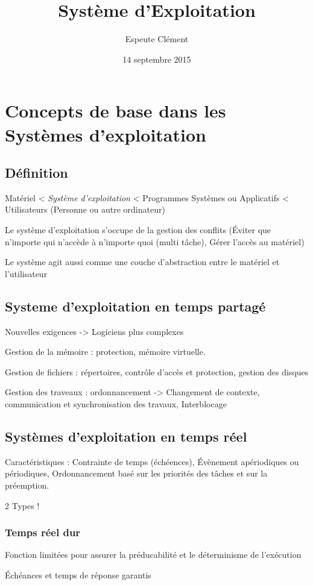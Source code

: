 \documentclass[11pt]{article}
\title{Système d'Exploitation}
\author{{\sc Espeute} Clément}
\date{14 septembre 2015}
\begin{document}
\pagestyle{fancy}
\maketitle
\newpage
\tableofcontents
\newpage
\section{Concepts de base dans les Systèmes d'exploitation}
\subsection{Définition}
\label{sub:}
Matériel < \emph{ Système d'exploitation} < Programmes Systèmes ou Applicatifs < Utilisateurs (Personne ou autre ordinateur)

Le système d'exploitation s'occupe de la gestion des conflits (Éviter que n'importe qui n'accède à n'importe quoi (multi tâche), Gérer l'accès au matériel)

Le système agit aussi comme une couche d'abstraction entre le matériel et l'utilisateur

\subsection{Systeme d'exploitation en temps partagé}
\label{sub:}
Nouvelles exigences -> Logiciens plus complexes

Gestion de la mémoire : protection, mémoire virtuelle.

Gestion de fichiers : répertoires, contrôle d'accès et protection, gestion des disques

Gestion des traveaux : ordonnancement -> Changement de contexte, communication et synchronisation des travaux, Interblocage

\subsection{Systèmes d'exploitation en temps réel}
\label{sub:}
Caractéristiques : Contrainte de temps (échéences), Évènement apériodiques ou périodiques, Ordonnancement basé sur les priorités des tâches et sur la préemption.

2 Types !
\subsubsection{Temps réel dur}
Fonction limitées pour assurer la préducabilité et le déterminisme de l'exécution

Échéances et temps de réponse garantis
\end{document}
